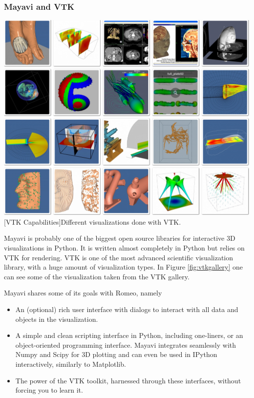 \subsubsection{Mayavi and VTK}
\vspace{1em}
\begin{minipage}{\linewidth}
    \centering
    \includegraphics[width=0.9\linewidth]{graphics/vtk.jpg}
    [VTK Capabilities]{Different visualizations done with VTK.}
    \label{fig:vtkgallery}
\end{minipage}

Mayavi\cite{DBLP:journals/corr/abs-1010-4891} is probably one of the biggest open source libraries for interactive 3D visualizations in Python.
It is written almost completely in Python but relies on \ac{VTK} for rendering.
\ac{VTK} is one of the most advanced scientific visualization library, with a huge amount of visualization types. 
In Figure \ref{fig:vtkgallery} one can see some of the visualization taken from the \ac{VTK} gallery\cite{VTKGallery}.

Mayavi shares some of its goals with Romeo, namely\cite{MayaviGoals}
\begin{itemize}
    \item An (optional) rich user interface with dialogs to interact with all data and objects in the visualization.
    \item A simple and clean scripting interface in Python, including one-liners, or an object-oriented programming interface. Mayavi integrates seamlessly with Numpy and Scipy for 3D plotting and can even be used in IPython interactively, similarly to Matplotlib.
    \item The power of the VTK toolkit, harnessed through these interfaces, without forcing you to learn it.
\end{itemize}

